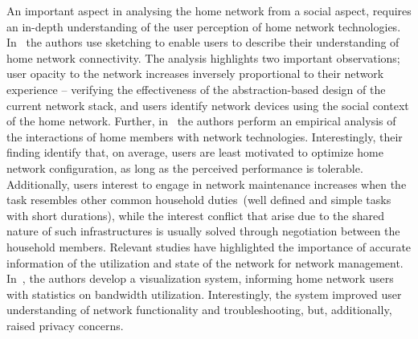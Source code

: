 An important aspect in analysing the home network from a social aspect, requires
an in-depth understanding of the user perception of  home network technologies.
In~\cite{shehanpoole08,grinter05} the authors use sketching to enable users to
describe their understanding of home network connectivity. The analysis
highlights two important observations; user opacity to the network increases
inversely proportional to their network experience -- verifying the
effectiveness of the abstraction-based design of the current network stack, and
users identify network devices using the social context of the home network.
Further, in~\cite{tolmie07} the authors perform an empirical analysis of the
interactions of home members with network technologies.  Interestingly, their
finding identify that, on average, users are least motivated to optimize home
network configuration, as long as the perceived performance is tolerable.
Additionally, users interest to engage in network maintenance increases when the
task resembles other common household duties~(well defined and simple tasks with
short durations), while the interest conflict that arise due to the shared
nature of such infrastructures is usually solved through negotiation between the
household members. Relevant studies have highlighted the importance of accurate
information of the utilization and state of the network for network management.
In~\cite{Chetty10}, the authors develop a visualization system, informing home
network users with statistics on bandwidth utilization.  Interestingly, the
system improved user understanding of network functionality and troubleshooting,
but, additionally, raised privacy concerns. 


